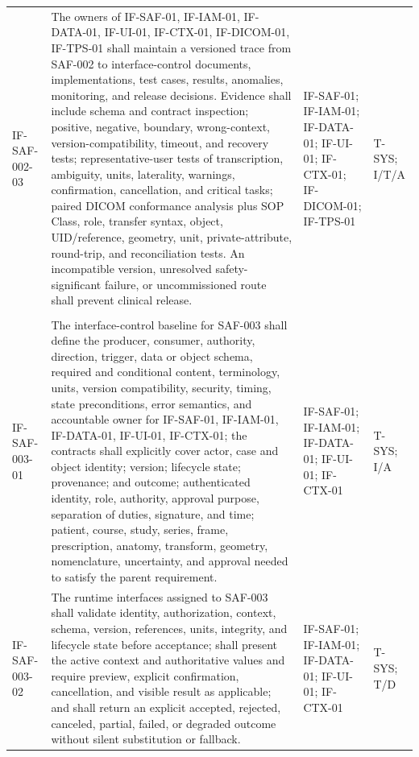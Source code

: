 \documentclass[11pt,letterpaper]{article}
\begin{document}
\begin{scriptsize}
\begin{longtable}{@{}L{0.14\textwidth}L{0.49\textwidth}L{0.19\textwidth}L{0.10\textwidth}@{}}
\addlinespace[2pt]
\mbox{IF-SAF-002-03} & The owners of IF-SAF-01, IF-IAM-01, IF-DATA-01, IF-UI-01, IF-CTX-01, IF-DICOM-01, IF-TPS-01 shall maintain a versioned trace from SAF-002 to interface-control documents, implementations, test cases, results, anomalies, monitoring, and release decisions. Evidence shall include schema and contract inspection; positive, negative, boundary, wrong-context, version-compatibility, timeout, and recovery tests; representative-user tests of transcription, ambiguity, units, laterality, warnings, confirmation, cancellation, and critical tasks; paired DICOM conformance analysis plus SOP Class, role, transfer syntax, object, UID\slash\allowbreak{}reference, geometry, unit, private-attribute, round-trip, and reconciliation tests. An incompatible version, unresolved safety-significant failure, or uncommissioned route shall prevent clinical release. & IF-SAF-01; IF-IAM-01; IF-DATA-01; IF-UI-01; IF-CTX-01; IF-DICOM-01; IF-TPS-01 & T-SYS; I\slash\allowbreak{}T\slash\allowbreak{}A \\
\addlinespace[2pt]
 \\
\addlinespace[2pt]
\mbox{IF-SAF-003-01} & The interface-control baseline for SAF-003 shall define the producer, consumer, authority, direction, trigger, data or object schema, required and conditional content, terminology, units, version compatibility, security, timing, state preconditions, error semantics, and accountable owner for IF-SAF-01, IF-IAM-01, IF-DATA-01, IF-UI-01, IF-CTX-01; the contracts shall explicitly cover actor, case and object identity; version; lifecycle state; provenance; and outcome; authenticated identity, role, authority, approval purpose, separation of duties, signature, and time; patient, course, study, series, frame, prescription, anatomy, transform, geometry, nomenclature, uncertainty, and approval needed to satisfy the parent requirement. & IF-SAF-01; IF-IAM-01; IF-DATA-01; IF-UI-01; IF-CTX-01 & T-SYS; I\slash\allowbreak{}A \\
\addlinespace[2pt]
\mbox{IF-SAF-003-02} & The runtime interfaces assigned to SAF-003 shall validate identity, authorization, context, schema, version, references, units, integrity, and lifecycle state before acceptance; shall present the active context and authoritative values and require preview, explicit confirmation, cancellation, and visible result as applicable; and shall return an explicit accepted, rejected, canceled, partial, failed, or degraded outcome without silent substitution or fallback. & IF-SAF-01; IF-IAM-01; IF-DATA-01; IF-UI-01; IF-CTX-01 & T-SYS; T\slash\allowbreak{}D \\

\end{longtable}
\end{scriptsize}
\end{document}
